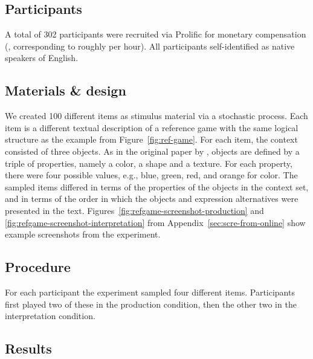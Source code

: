 \documentclass[fleqn]{article}
\begin{document}
\subsection{Participants}
\label{participants}

A total of 302 participants were recruited via Prolific for monetary
compensation (, corresponding to roughly  per hour).
All participants self-identified as native speakers of English.

\subsection{Materials \& design}
\label{materials-design}

We created 100 different items as stimulus material via a stochastic process.
Each item is a different textual description of a reference game with the same logical structure as the example from Figure~\ref{fig:ref-game}.
For each item, the context consisted of three objects.
As in the original paper by \citet{FrankGoodman2012:Predicting-Prag}, objects are defined by a triple of properties, namely a color, a shape and a texture.
For each property, there were four possible values, e.g., blue, green, red, and orange for color.
The sampled items differed in terms of the properties of the objects in the context set, and in terms of the order in which the objects and expression alternatives were presented in the text.
Figures~\ref{fig:refgame-screenshot-production} and \ref{fig:refgame-screenshot-interpretation} from Appendix~\ref{sec:scre-from-online} show example screenshots from the experiment.

\subsection{Procedure}
\label{procedure}

For each participant the experiment sampled four different items.
Participants first played two of these in the production condition, then the other two in the interpretation condition.


\subsection{Results}\label{results}
\end{document}
